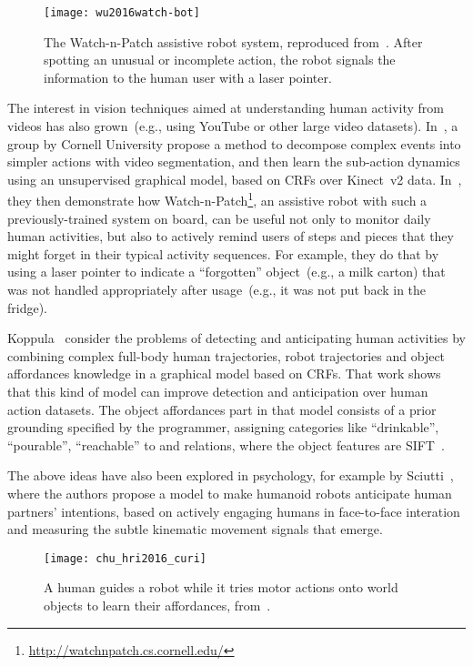 \begin{figure}
\centering
\texttt{[image: wu2016watch-bot]}
\caption[The Watch-n-Patch assistive robot system, reproduced from~\cite{wu:2016:icra}.]{The Watch-n-Patch assistive robot system, reproduced from~\cite{wu:2016:icra}. After spotting an unusual or incomplete action, the robot signals the information to the human user with a laser pointer.}
\label{fig:watchbot}
\end{figure}

The interest in vision techniques aimed at understanding human activity from videos has also grown~(e.g., using YouTube or other large video datasets).
In~\cite{wu:2015:cvpr}, a group by Cornell University propose a method to decompose complex events into simpler actions with video segmentation, and then learn the sub-action dynamics using an unsupervised graphical model, based on \acp{CRF} over Kinect~v2 data.
In~\cite{wu:2016:icra}, they then demonstrate how Watch-n-Patch\footnote{\url{http://watchnpatch.cs.cornell.edu/}}, an assistive robot with such a previously-trained system on board, can be useful not only to monitor daily human activities, but also to actively remind users of steps and pieces that they might forget in their typical activity sequences.
For example, they do that by using a laser pointer to indicate a ``forgotten'' object~(e.g., a milk carton) that was not handled appropriately after usage~(e.g., it was not put back in the fridge).

Koppula~\cite{koppula:2016:pami} consider the problems of detecting and anticipating human activities by combining complex full-body human trajectories, robot trajectories and object affordances knowledge in a graphical model based on \acp{CRF}.
That work shows that this kind of model can improve detection and anticipation over human action datasets.
The object affordances part in that model consists of a prior grounding specified by the programmer, assigning categories like ``drinkable'', ``pourable'', ``reachable'' to \actobj{} and \objobj{} relations, where the object features are \ac{SIFT}~\cite{lowe:1999:sift}.

The above ideas have also been explored in psychology, for example by Sciutti~\cite{sciutti:2015:fpsyg}, where the authors propose a model to make humanoid robots anticipate human partners' intentions, based on actively engaging humans in face-to-face interation and measuring the subtle kinematic movement signals that emerge.

\begin{figure}
\centering
\texttt{[image: chu\_hri2016\_curi]}
\caption{A human guides a robot while it tries motor actions onto world objects to learn their affordances, from~\cite{chu:2016:hri}.}
\label{fig:chu_hri2016_curi}
\end{figure}

